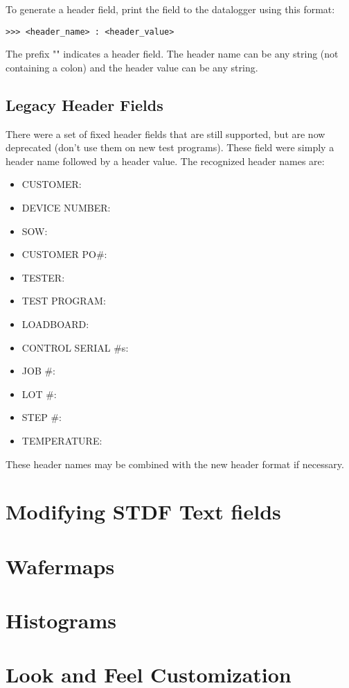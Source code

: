 \documentclass[letterpaper]{article}
\begin{document}
To generate a header field, print the field to the datalogger using this format:
\begin{verbatim}
>>> <header_name> : <header_value>
\end{verbatim}
The prefix "\gT\gT\gT" indicates a header field.  The header name can be any string (not containing a colon)
and the header value can be any string.
\clearpage
\subsection{Legacy Header Fields}
There were a set of fixed header fields that are still supported, but are now deprecated (don't use them on new test programs).
These field were simply a header name followed by a header value.  The recognized header names
are:
\begin{itemize}
\item CUSTOMER:
\item DEVICE NUMBER:
\item SOW:
\item CUSTOMER PO\#:
\item TESTER:
\item TEST PROGRAM:
\item LOADBOARD:
\item CONTROL SERIAL \#s:
\item JOB \#:
\item LOT \#:
\item STEP \#:
\item TEMPERATURE:
\end{itemize}

These header names may be combined with the new header format if necessary.

\section{Modifying STDF Text fields}

\section{Wafermaps}


\section{Histograms}


\section{Look and Feel Customization}
\end{document}
